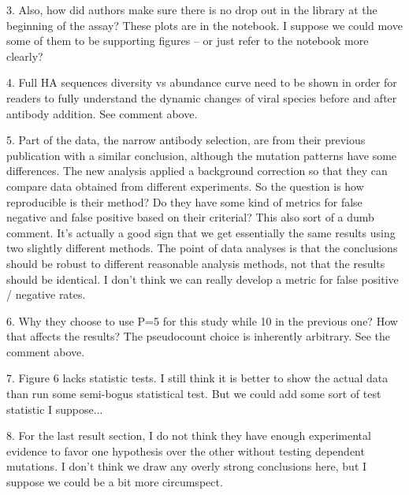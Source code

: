 \documentclass[11pt, oneside]{article}   	%
\begin{document}
3. Also, how did authors make sure there is no drop out in the library at the beginning of the assay?
{\color{red}
These plots are in the notebook. 
I suppose we could move some of them to be supporting figures -- or just refer to the notebook more clearly?
}

4. Full HA sequences diversity vs abundance curve need to be shown in order for readers to fully understand the dynamic changes of viral species before and after antibody addition.
{\color{red}
See comment above.
}

5. Part of the data, the narrow antibody selection, are from their previous publication with a similar conclusion, although the mutation patterns have some differences. The new analysis applied a background correction so that they can compare data obtained from different experiments. So the question is how reproducible is their method? Do they have some kind of metrics for false negative and false positive based on their criterial?
{\color{red}
This also sort of a dumb comment.
It's actually a good sign that we get essentially the same results using two slightly different methods.
The point of data analyses is that the conclusions should be robust to different reasonable analysis methods, not that the results should be identical.
I don't think we can really develop a metric for false positive / negative rates.
}

6. Why they choose to use P=5 for this study while 10 in the previous one? How that affects the results?
{\color{red}
The pseudocount choice is inherently arbitrary.
See the comment above.
}

7. Figure 6 lacks statistic tests.
{\color{red}
I still think it is better to show the actual data than run some semi-bogus statistical test.
But we could add some sort of test statistic I suppose...}

8. For the last result section, I do not think they have enough experimental evidence to favor one hypothesis over the other without testing dependent mutations.
{\color{red}
I don't think we draw any overly strong conclusions here, but I suppose we could be a bit more circumspect.
}
\end{document}
